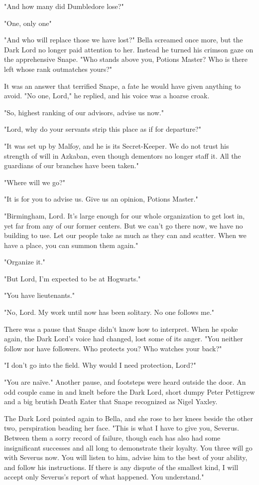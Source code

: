 "And how many did Dumbledore lose?"

"One, only one{\el}"

"And who will replace those we have lost?" Bella screamed once more, but the Dark Lord no longer paid attention to her. Instead he turned his crimson gaze on the apprehensive Snape. "Who stands above you, Potions Master? Who is there left whose rank outmatches yours?"

It was an answer that terrified Snape, a fate he would have given anything to avoid. "No one, Lord," he replied, and his voice was a hoarse croak.

"So, highest ranking of our advisors, advise us now."

"Lord, why do your servants strip this place as if for departure?"

"It was set up by Malfoy, and he is its Secret-Keeper. We do not trust his strength of will in Azkaban, even though dementors no longer staff it. All the guardians of our branches have been taken."

"Where will we go?"

"It is for you to advise us. Give us an opinion, Potions Master."

"Birmingham, Lord. It's large enough for our whole organization to get lost in, yet far from any of our former centers. But we can't go there now, we have no building to use. Let our people take as much as they can and scatter. When we have a place, you can summon them again."

"Organize it."

"But Lord, I'm expected to be at Hogwarts."

"You have lieutenants."

"No, Lord. My work until now has been solitary. No one follows me."

There was a pause that Snape didn't know how to interpret. When he spoke again, the Dark Lord's voice had changed, lost some of its anger. "You neither follow nor have followers. Who protects you? Who watches your back?"

"I don't go into the field. Why would I need protection, Lord?"

"You are naïve." Another pause, and footsteps were heard outside the door. An odd couple came in and knelt before the Dark Lord, short dumpy Peter Pettigrew and a big brutish Death Eater that Snape recognized as Nigel Yaxley.

The Dark Lord pointed again to Bella, and she rose to her knees beside the other two, perspiration beading her face. "This is what I have to give you, Severus. Between them a sorry record of failure, though each has also had some insignificant successes and all long to demonstrate their loyalty. You three will go with Severus now. You will listen to him, advise him to the best of your ability, and follow his instructions. If there is any dispute of the smallest kind, I will accept only Severus's report of what happened. You understand."

